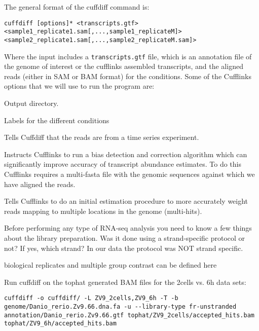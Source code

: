 \begin{information}
The general format of the cuffdiff command is:
\begin{lstlisting}[style=command_syntax]
cuffdiff [options]* <transcripts.gtf> <sample1_replicate1.sam[,...,sample1_replicateM]> <sample2_replicate1.sam[,...,sample2_replicateM.sam]>
\end{lstlisting}

Where the input includes a \texttt{transcripts.gtf} file, which is an annotation
file of the genome of interest or the cufflinks assembled transcripts, and the aligned reads (either in SAM or BAM
format) for the conditions.
Some of the Cufflinks options that we will use to run the program are:
\begin{description}[style=multiline,labelindent=0cm,align=right,leftmargin=\descriptionlabelspace,rightmargin=1.5cm,font=\ttfamily]
  \item[-o] Output directory.
  \item[-L] Labels for the different conditions
  \item[-T] Tells Cuffdiff that the reads are from a time series experiment.
  \item[-b] Instructs Cufflinks to run a bias detection and correction algorithm
  which can significantly improve accuracy of transcript abundance estimates.
  To do this Cufflinks requires a multi-fasta file with the genomic sequences
  against which we have aligned the reads.
  \item[-u] Tells Cufflinks to do an initial estimation procedure to more
  accurately weight reads mapping to multiple locations in the genome
  (multi-hits). 
  \item[--library-type] Before performing any type of RNA-seq analysis you need
 to know a few things about the library preparation. Was it done using a
 strand-specific protocol or not? If yes, which strand? In our data the protocol
 was NOT strand specific.
  \item[-C] biological replicates and multiple group contrast can be defined here 
\end{description}
\end{information}

\begin{steps}
Run cuffdiff on the tophat generated BAM files for the 2cells vs. 6h data sets:
\begin{lstlisting}
cuffdiff -o cuffdiff/ -L ZV9_2cells,ZV9_6h -T -b genome/Danio_rerio.Zv9.66.dna.fa -u --library-type fr-unstranded annotation/Danio_rerio.Zv9.66.gtf tophat/ZV9_2cells/accepted_hits.bam tophat/ZV9_6h/accepted_hits.bam
\end{lstlisting}
\end{steps}


